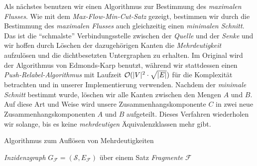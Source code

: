 Als nächstes benutzen wir einen Algorithmus zur Bestimmung des \emph{maximalen Flusses}. Wie mit dem \emph{Max-Flow-Min-Cut-Satz} gezeigt, bestimmen wir durch die Bestimmung des \emph{maximalen Flusses} auch gleichzeitig einen \emph{minimalen Schnitt}. Das ist die \enquote{schmalste} Verbindungsstelle zwischen der \emph{Quelle} und der \emph{Senke} und wir hoffen durch Löschen der dazugehörigen Kanten die \emph{Mehrdeutigkeit} aufzulösen und die dichtbesetzten Untergraphen zu erhalten. Im Original wird der Algorithmus von Edmonds-Karp benutzt, während wir stattdessen einen \emph{Push-Relabel-Algorithmus} mit Laufzeit \emph{$\mathcal{O}(|V|^2\cdot \sqrt{|E|})$} für die Komplexität betrachten und in unserer Implementierung verwenden. Nachdem der \emph{minimale Schnitt} bestimmt wurde, löschen wir alle Kanten zwischen den Mengen $A$ und $B$. Auf diese Art und Weise wird unsere Zusammenhangskomponente $C$ in zwei neue Zusammenhangskomponenten $A$ und $B$ aufgeteilt. Dieses Verfahren wiederholen wir solange, bis es keine \emph{mehrdeutigen} Äquivalenzklassen mehr gibt.  


\begin{algorithm}
	\caption{Algorithmus zum Auflösen von Mehrdeutigkeiten}
	\label{alg:amb_res}
	\begin{algorithmic}[1]
		\Require \emph{Inzidenzgraph} $G_{\mathcal{F}} = (\mathcal{S},E_{\mathcal{F}})$ über einem Satz \emph{Fragmente} $\mathcal{F}$
				\EndWhile
			\EndWhile
		\EndProcedure
	\end{algorithmic}
\end{algorithm}

